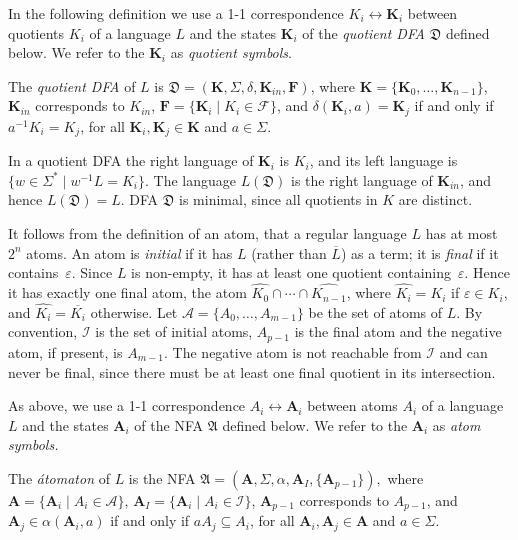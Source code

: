\documentclass{llncs}
\newcommand{\ol}{\overline}
\newcommand{\eps}{\varepsilon}
\newcommand{\Sig}{\Sigma}
\newcommand{\bA}{{\mathbf A}}
\newcommand{\bmA}{\bm{A}}
\newcommand{\bmF}{\bm{F}}
\newcommand{\bmK}{\bm{K}}
\newcommand{\cA}{{\mathcal A}}
\newcommand{\cF}{{\mathcal F}}
\newcommand{\cI}{{\mathcal I}}
\newcommand{\fA}{{\mathfrak A}}
\newcommand{\fD}{{\mathfrak D}}
\begin{document}
In the following definition we use a 1-1 correspondence 
$K_i \leftrightarrow  \bmK_i$ between quotients $K_i$ of 
a language $L$ and the states ${\mathbf K}_i$ of the \emph{quotient DFA} 
$\fD$ defined below.
We refer to the ${\mathbf K}_i$ as \emph{quotient symbols}.
\begin{definition}
\label{def:quotientDFA}
\vskip-0.1cm
The \emph{quotient DFA} of $L$ is 
$\fD=(\bmK,\Sig,\delta, {\mathbf K_{in}}, \bmF)$, where
${\bmK}=\{{\mathbf K_0},\ldots,{\mathbf K_{n-1}}\}$,
${\mathbf K_{in}}$ corresponds to $K_{in}$,
$\bmF=\{{\mathbf K_i}\mid K_i \in \cF\}$, and 
$\delta({\mathbf K}_i, a)={\mathbf K}_j$ if and only if 
$a^{-1}K_i = K_j$, for all ${\mathbf K_i},{\mathbf K_j}\in \bmK$ and $a\in \Sig$.
\end{definition}

In a quotient DFA
the right language of ${\mathbf K_i}$ is $K_i$, and 
its left language 
is $\{w\in\Sig^*\mid w^{-1}L=K_i\}$.
The  language $L(\fD)$  is the right language of ${\mathbf K_{in}}$, and hence 
$L(\fD)=L$.
DFA $\fD$ is minimal, since all quotients in $K$ are distinct.


It follows from the definition of an atom, that a regular language  $L$ has at most $2^n$ atoms. 
An atom is \emph{initial} if it has $L$ (rather than $\ol{L}$) as a term;
it is \emph{final} if it contains~$\eps$.
Since $L$ is non-empty, it has at least one quotient containing~$\eps$. 
Hence it has exactly one final atom, the atom 
$\widehat{K_0}\cap \cdots \cap \widehat{K_{n-1}}$, where 
$\widehat{K_i}=K_i$ if $\eps\in K_i$, and $\widehat{K_i}=\ol{K_i}$ otherwise.
Let  $\cA=\{A_0,\ldots, A_{m-1}\}$ be the set of atoms of $L$.
By convention, $\cI$ is the set of initial atoms,  $A_{p-1}$ is the final atom and the negative atom, if present, is $A_{m-1}$.
The negative atom  is not reachable from $\cI$ and can never be final, since there must be at least one final quotient in its intersection.

As above, we use a 1-1 correspondence 
$A_i \leftrightarrow  {\mathbf A}_i$ between atoms $A_i$ of a language $L$ and 
the states ${\mathbf A}_i$ of the NFA $\fA$ defined below.
We refer to the ${\mathbf A}_i$ as \emph{atom symbols.}

\begin{definition}
\label{def:atomaton}
The \emph{\'atomaton} of $L$
 is the NFA $\fA=(\bmA,\Sig,\alpha,\bmA_I, \{\bA_{p-1}\}),$
 where $\bmA=\{{\mathbf A}_i\mid A_i\in \cA\}$,
 $\bmA_I=\{{\mathbf A}_i\mid A_i\in \cI\}$, 
 $\bA_{p-1}$ corresponds to $A_{p-1}$,
 and ${\mathbf A}_j \in \alpha({\mathbf A}_i, a)$ if and only if 
$aA_j \subseteq A_i$, for all ${\mathbf A_i},{\mathbf A_j}\in \bmA$ and $a\in\Sig$.
\end{definition}
\end{document}
